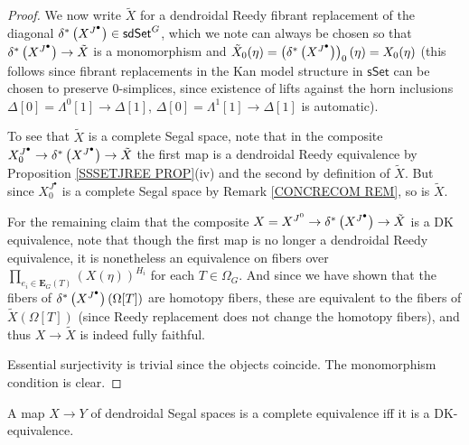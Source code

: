 \documentclass[a4paper,10pt
 ,draft
]{article}%
\begin{document}
\begin{proof}
We now write $\tilde{X}$ for a dendroidal Reedy fibrant replacement of the diagonal 
$\delta^{\**} \left(X^{J^{\bullet}}\right) \in \mathsf{sdSet}^G$,
which we note can always be chosen so that
$\delta^{\**} \left(X^{J^{\bullet}}\right) \to \tilde{X}$
is a monomorphism and
$\tilde{X}_0(\eta) = 
\left(\delta^{\**} \left(X^{J^{\bullet}}\right)\right)_0(\eta)=
X_0(\eta)$ (this follows since fibrant replacements in the Kan model structure in $\mathsf{sSet}$ can be chosen to preserve $0$-simplices, since existence of lifts against the horn inclusions
$\Delta[0]=\Lambda^0[1]\to \Delta[1]$,
$\Delta[0]=\Lambda^1[1]\to \Delta[1]$
is automatic).

To see that $\tilde{X}$ is a complete Segal space, note that in the composite
$X_0^{J^{\bullet}} \to
\delta^{\**}\left( X^{J^{\bullet}} \right)
\to \tilde{X}$
the first map is a dendroidal Reedy equivalence by Proposition \ref{SSSETJREE PROP}(iv) and the second by definition of $\tilde{X}$.
But since $X_0^{J^{\bullet}}$ is a complete Segal space by Remark \ref{CONCRECOM REM}, so is $\tilde{X}$.

For the remaining claim that the composite
$X = X^{J^{0}} \to 
\delta^{\**}\left( X^{J^{\bullet}} \right)
\to \tilde{X}$
is a DK equivalence, 
note that though
the first map is no longer a dendroidal Reedy equivalence, 
it is nonetheless an equivalence
on fibers over
$\prod_{e_i \in \boldsymbol{E}_G(T)} \left(X(\eta)\right)^{H_i}$
for each $T\in \Omega_G$.
And since we have shown that the fibers of
$\delta^{\**}\left( X^{J^{\bullet}} \right)(\Omega[T])$
 are homotopy fibers, these are equivalent to the fibers of $\tilde{X}(\Omega[T])$ (since Reedy replacement does not change the homotopy fibers), 
and thus $X \to \tilde{X}$ is indeed fully faithful.

Essential surjectivity is trivial since the objects coincide.
The monomorphism condition is clear.
\end{proof}


\begin{theorem}\label{COMPIFFDK THM}
	A map $X \to Y$ of dendroidal Segal spaces is a complete equivalence iff it is a DK-equivalence.
\end{theorem}
\end{document}
